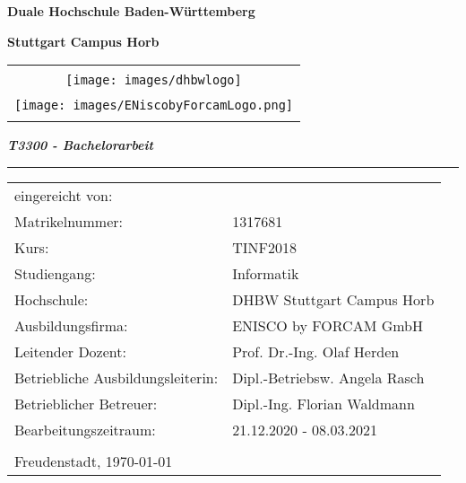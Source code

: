 \titlepage
\begin{center}
    \textbf{\large{}Duale Hochschule Baden-Württemberg }{\large\par}
    \par
\end{center}
\begin{center}
    \textbf{\large{}Stuttgart Campus Horb}{\large\par}
    \par
\end{center}
\begin{center}
    \begin{tabular}{l||r}
        \multicolumn{2}{c}{\vspace{1cm}}
        \tabularnewline
        \multicolumn{2}{c}{\texttt{[image: images/dhbwlogo]}}
        \tabularnewline
        \multicolumn{2}{c}{}
        \tabularnewline
        \multicolumn{2}{c}{\texttt{[image: images/ENiscobyForcamLogo.png]}}
        \tabularnewline
        \multicolumn{2}{c}{\vspace{1cm}}
        \tabularnewline
    \end{tabular}
    \par
\end{center}
\vspace{0.5cm}

\begin{flushleft}
    \textbf{\Large{}\title{}}{\Large\par}
    \par
\end{flushleft}

\begin{flushleft}
    \textbf{\textit{T3300 - Bachelorarbeit}}
    \par
\end{flushleft}

\begin{flushleft}
    {\Large{}\rule[0.5ex]{1\columnwidth}{1pt}}{\Large\par}
    \par
\end{flushleft}

\begin{tabular}{ll}
    eingereicht von:\hspace{1cm} & \author{}
    \tabularnewline
    Matrikelnummer: & 1317681
    \tabularnewline
    Kurs: & TINF2018
    \tabularnewline
    Studiengang: & Informatik
    \tabularnewline
    Hochschule: & DHBW Stuttgart Campus Horb
    \tabularnewline
    Ausbildungsfirma: & ENISCO by FORCAM GmbH
    \tabularnewline
    Leitender Dozent: & Prof. Dr.-Ing. Olaf Herden
    \tabularnewline
    Betriebliche Ausbildungsleiterin: & Dipl.-Betriebsw. Angela Rasch
    \tabularnewline
    Betrieblicher Betreuer: & Dipl.-Ing. Florian Waldmann
    \tabularnewline
    Bearbeitungszeitraum: & 21.12.2020 - 08.03.2021
    \tabularnewline
    \tabularnewline
    \multicolumn{2}{l}{Freudenstadt, \today}
    \tabularnewline
\end{tabular}

\begin{flushleft}
    \newpage{}
    \par
\end{flushleft}